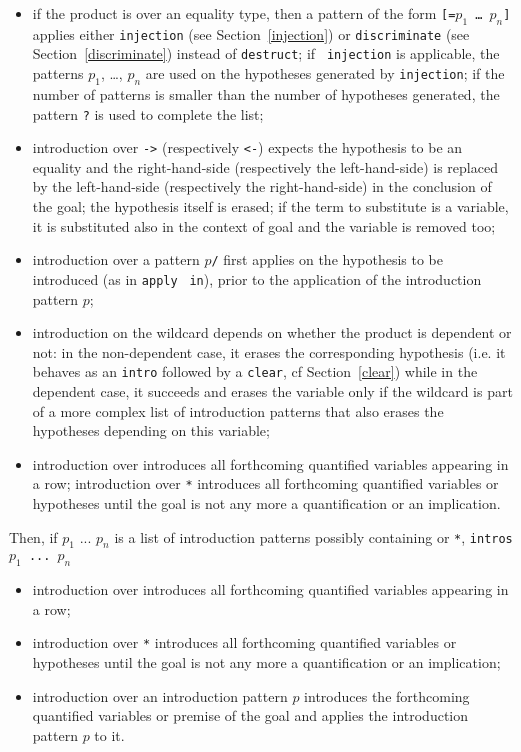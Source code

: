 \begin{coq_example*}
\begin{itemize}
  hypothesis with type {\tt A\verb|/\|exists x, B\verb|/\|C\verb|/\|D} can be
  introduced via pattern {\tt (a \& x \& b \& c \& d)};
\item if the product is over an equality type, then a pattern of the
  form {\tt [=$p_{1}$ \dots\ $p_n$]} applies either {\tt injection}
  (see Section~\ref{injection}) or {\tt discriminate} (see
  Section~\ref{discriminate}) instead of {\tt destruct}; if {\tt
    injection} is applicable, the patterns $p_1$, \ldots, $p_n$ are
  used on the hypotheses generated by {\tt injection}; if the number
  of patterns is smaller than the number of hypotheses generated, the
  pattern \texttt{?} is used to complete the list;
\item introduction over {\tt ->} (respectively {\tt <-}) expects the
  hypothesis to be an equality and the right-hand-side (respectively
  the left-hand-side) is replaced by the left-hand-side (respectively
  the right-hand-side) in the conclusion of the goal; the hypothesis
  itself is erased; if the term to substitute is a variable, it is
  substituted also in the context of goal and the variable is removed
  too;
\item introduction over a pattern $p${\tt /{\term}} first applies
  {\term} on the hypothesis to be introduced (as in {\tt apply
  }{\term} {\tt in}), prior to the application of the introduction
  pattern $p$;
\item introduction on the wildcard depends on whether the product is
  dependent or not: in the non-dependent case, it erases the
  corresponding hypothesis (i.e. it behaves as an {\tt intro} followed
  by a {\tt clear}, cf Section~\ref{clear}) while in the dependent
  case, it succeeds and erases the variable only if the wildcard is
  part of a more complex list of introduction patterns that also
  erases the hypotheses depending on this variable;
\item introduction over {\tt *} introduces all forthcoming quantified
  variables appearing in a row; introduction over {\tt **} introduces
  all forthcoming quantified variables or hypotheses until the goal is
  not any more a quantification or an implication.
\end{itemize}

Then, if $p_1$ ... $p_n$ is a list of introduction patterns possibly
containing {\tt *} or {\tt **}, {\tt intros $p_1$ ... $p_n$}
\begin{itemize}
\item introduction over {\tt *} introduces all forthcoming quantified
  variables appearing in a row;
\item introduction over {\tt **} introduces all forthcoming quantified
  variables or hypotheses until the goal is not any more a
  quantification or an implication;
\item introduction over an introduction pattern $p$ introduces the
  forthcoming quantified variables or premise of the goal and applies
  the introduction pattern $p$ to it.
\end{itemize}


\end{coq_example*}
